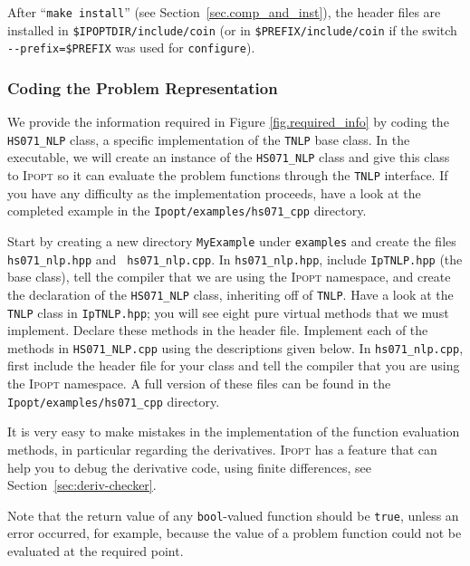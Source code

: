 \documentclass[10pt]{article}
\newcommand{\Ipopt}{\textsc{Ipopt}\xspace}
\begin{document}
After ``\texttt{make install}'' (see Section~\ref{sec.comp_and_inst}),
the header files are installed in \texttt{\$IPOPTDIR/include/coin}
(or in \texttt{\$PREFIX/include/coin} if the switch
\verb|--prefix=$PREFIX| was used for {\tt configure}).  %

\subsubsection{Coding the Problem Representation}\label{sec.cpp_problem}
We provide the information required in Figure \ref{fig.required_info}
by coding the {\tt HS071\_NLP} class, a specific implementation of the
{\tt TNLP} base class. In the executable, we will create an instance
of the {\tt HS071\_NLP} class and give this class to \Ipopt so it can
evaluate the problem functions through the {\tt TNLP} interface. If
you have any difficulty as the implementation proceeds, have a look at
the completed example in the {\tt Ipopt/examples/hs071\_cpp} directory.

Start by creating a new directory {\tt MyExample} under {\tt examples} and 
create the files {\tt hs071\_nlp.hpp} and {\tt
  hs071\_nlp.cpp}. In {\tt hs071\_nlp.hpp}, include {\tt IpTNLP.hpp}
(the base class), tell the compiler that we are using the \Ipopt
namespace, and create the declaration of the {\tt HS071\_NLP} class,
inheriting off of {\tt TNLP}. Have a look at the {\tt TNLP} class in
{\tt IpTNLP.hpp}; you will see eight pure virtual methods that we must
implement. Declare these methods in the header file.  Implement each
of the methods in {\tt HS071\_NLP.cpp} using the descriptions given
below. In {\tt hs071\_nlp.cpp}, first include the header file for your
class and tell the compiler that you are using the \Ipopt namespace.
A full version of these files can be found in the {\tt
  Ipopt/examples/hs071\_cpp} directory.

It is very easy to make mistakes in the implementation of the function
evaluation methods, in particular regarding the derivatives.  \Ipopt
has a feature that can help you to debug the derivative code, using
finite differences, see Section~\ref{sec:deriv-checker}.

Note that the return value of any {\tt bool}-valued function should be
{\tt true}, unless an error occurred, for example, because the value of
a problem function could not be evaluated at the required point.
\end{document}
